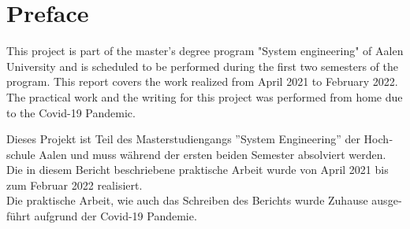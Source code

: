 \chapter*{Preface}
\label{preface}

This project is part of the master’s degree program "System engineering" of Aalen University and is scheduled to be performed during the first two semesters of the program. This report covers the work realized from April 2021 to February 2022.\\
The practical work and the writing for this project was performed from home due to the Covid-19 Pandemic.

\vspace*{25mm}

\begin{otherlanguage}{ngerman}
    Dieses Projekt ist Teil des Masterstudiengangs ''System Engineering'' der Hochschule Aalen und muss während der ersten beiden Semester absolviert werden. Die in diesem Bericht beschriebene praktische Arbeit wurde von April 2021 bis zum Februar 2022 realisiert.\\
    Die praktische Arbeit, wie auch das Schreiben des Berichts wurde Zuhause ausgeführt aufgrund der Covid-19 Pandemie.
\end{otherlanguage}